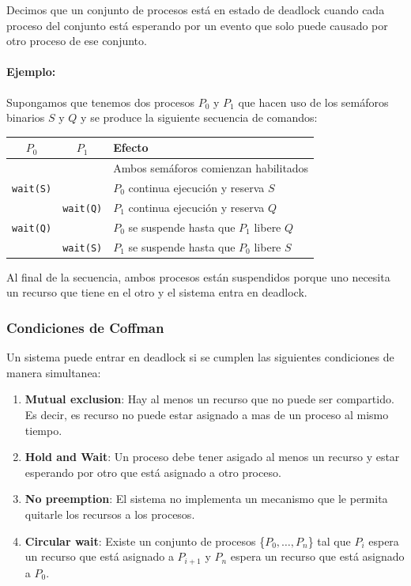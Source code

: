 Decimos que un conjunto de procesos está en estado de deadlock cuando cada proceso del conjunto está esperando por un evento que solo puede causado por otro proceso de ese conjunto.

\paragraph{Ejemplo:} Supongamos que tenemos dos procesos $P_0$ y $P_1$ que hacen uso de los semáforos binarios $S$ y $Q$ y se produce la siguiente secuencia de comandos:

\begin{center}
\begin{tabularx}{0.8\textwidth}{|C{0.5}|C{0.5}|L{2}|}
	\hline 
	\textbf{$P_0$} & \textbf{$P_1$} & Efecto \\
	\hline
	& & Ambos semáforos comienzan habilitados \\
	\hline
	\texttt{wait(S)} & & $P_0$ continua ejecución y reserva $S$\\
	\hline
	 & \texttt{wait(Q)} & $P_1$ continua ejecución y reserva $Q$ \\
	\hline
	\texttt{wait(Q)}  & & $P_0$ se suspende hasta que $P_1$ libere $Q$ \\	
	\hline
	 & \texttt{wait(S)} &  $P_1$ se suspende hasta que $P_0$ libere $S$\\	
	\hline
\end{tabularx}
 \end{center}
Al final de la secuencia, ambos procesos están suspendidos porque uno necesita un recurso que tiene en el otro y el sistema entra en deadlock.

\subsubsection{Condiciones de Coffman}
Un sistema puede entrar en deadlock si se cumplen las siguientes condiciones de manera simultanea:

\begin{enumerate}
	\item\textbf{Mutual exclusion}: Hay al menos un recurso que no puede ser compartido. Es decir, es recurso no puede estar asignado a mas de un proceso al mismo tiempo.
	\item \textbf{Hold and Wait}: Un proceso debe tener asigado al menos un recurso y estar esperando por otro que está asignado a otro proceso.
	\item \textbf{No preemption}: El sistema no implementa un mecanismo que le permita quitarle los recursos a los procesos.
	\item \textbf{Circular wait}: Existe un conjunto de procesos \{$P_0,\dots,P_n$\} tal que $P_i$ espera un recurso que está asignado a $P_{i+1}$ y $P_n$ espera un recurso que está asignado a $P_0$.
\end{enumerate}

